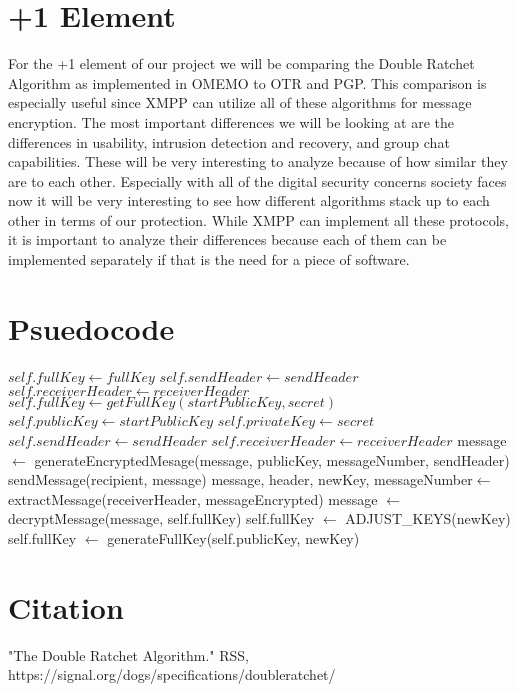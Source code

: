 \documentclass{article}
\begin{document}
\section{+1 Element}

For the +1 element of our project we will be comparing the Double Ratchet Algorithm as implemented in OMEMO to OTR and PGP. 
This comparison is especially useful since XMPP can utilize all of these algorithms for message encryption.
The most important differences we will be looking at are the differences in usability, intrusion detection and recovery, and group chat capabilities. 
These will be very interesting to analyze because of how similar they are to each other.
Especially with all of the digital security concerns society faces now it will be very interesting to see how different algorithms stack up to each other in terms of our protection.
While XMPP can implement all these protocols, it is important to analyze their differences because each of them can be implemented separately if that is the need for a piece of software.

\section{Psuedocode}

    \begin{algorithm}
    \begin{algorithmic}
		\State $self.fullKey \gets fullKey$
		\State $self.sendHeader \gets sendHeader$
		\State $self.receiverHeader \gets receiverHeader$
	\EndProcedure
		\State $self.fullKey \gets getFullKey(startPublicKey, secret)$
		\State $self.publicKey \gets startPublicKey$
		\State $self.privateKey \gets secret$
		\State $self.sendHeader \gets sendHeader$
		\State $self.receiverHeader \gets receiverHeader$
	\EndProcedure
		\State message $\gets$ generateEncryptedMesage(message, publicKey, messageNumber, sendHeader) 
		\State sendMessage(recipient, message)
	\EndProcedure
		\State message, header, newKey, messageNumber$\gets$ extractMessage(receiverHeader, messageEncrypted)
		\State message $\gets$ decryptMessage(message, self.fullKey) 
		\State self.fullKey $\gets$ ADJUST\_KEYS(newKey)
	\EndProcedure
		\State self.fullKey $\gets$ generateFullKey(self.publicKey, newKey)
	\EndProcedure
    	\end{algorithmic}
    \end{algorithm}

\section{Citation}

"The Double Ratchet Algorithm." RSS, https://signal.org/dogs/specifications/doubleratchet/


    
	
	    
\end{document}
